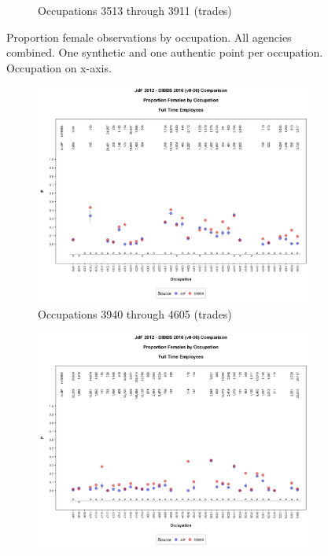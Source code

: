 \documentclass[10pt, letterpaper]{article}
\begin{document}
\begin{spacing}{1.0}
\begin{figure}[h]
\begin{subfigure}{1\textwidth}
        \caption{Occupations 3513 through 3911 (trades)}
        \vspace{10pt}
    \end{subfigure}
    \caption{Proportion female observations by occupation.  All agencies combined.  One synthetic and one authentic point per occupation.  Occupation on x-axis.}
    \label{figure:JdFDIBBSOccupationProportionBar3}
\end{figure}

\clearpage

\begin{figure}[h]
    \centering
    \begin{subfigure}{1\textwidth}
        \centering
        \includegraphics[width=6in, trim={0 1in 0 1in}, clip]{JdFDIBBSOccupationProportionBar561.png}
        \caption{Occupations 3940 through 4605 (trades)}
        \vspace{10pt}
    \end{subfigure}
    \begin{subfigure}{1\textwidth}
        \centering
        \includegraphics[width=6in, trim={0 1in 0 1in}, clip]{JdFDIBBSOccupationProportionBar601.png}

\end{subfigure}
\end{figure}
\end{spacing}
\end{document}
